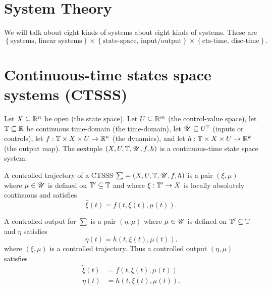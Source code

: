 \section{System Theory}

We will talk about eight kinds of systems about eight kinds of systems. These are 
\[
\left\{ \text{systems, linear systems} \right\} \times  \left\{ \text{state-space, input/output} \right\} \times  \left\{ \text{cts-time, disc-time} \right\} 
.\] 
\section{Continuous-time states space systems (CTSSS)}
\begin{definition}
	Let $X \subseteq \mathbb{R} ^{n}$ be open (the state space). Let $U \subseteq \mathbb{R} ^{m}$ (the control-value space), let $\mathbb{T} \subseteq \mathbb{R}$ be continuous time-domain (the time-domain), let $\mathscr{U} \subseteq U^{\mathbb{T}}$ (inputs or controls), let $f : \mathbb{T} \times  X \times  U \to \mathbb{R}^{n}$ (the dynamics), and let  $h  : \mathbb{T} \times  X \times  U  \to \mathbb{R} ^{k}$ (the output map). The sextuple $\left( X, U, \mathbb{T}, \mathscr{U}, f, h \right) $ is a continuous-time state space system. 
\end{definition}

\begin{definition}
	A controlled trajectory of a CTSSS $\sum = \left( X, U, \mathbb{T}, \mathscr{U}, f, h \right)  $ is a pair $\left( \xi , \mu \right) $ where $\mu \in  \mathscr{U}$ is defined on $\mathbb{T} ' \subseteq \mathbb{T}$ and where $\xi : \mathbb{T} '  \to X$ is locally absolutely continuous and satisfies 
	\[
		\hat{\xi}\left( t \right) = f\left( t, \xi\left( t \right) , \mu\left( t \right)  \right) 
	.\] 
\end{definition}

\begin{definition}
	A controlled output for $\sum$ is a pair $\left( \eta, \mu \right) $ where $\mu \in  \mathscr{U}$ is defined on $\mathbb{T} ' \subseteq \mathbb{T}$ and $\eta$ satisfies 
	\[
		\eta\left( t \right) = h \left( t, \xi\left( t \right) , \mu\left( t \right)  \right) 
	.\] 
	where $\left( \xi, \mu \right) $ is a controlled trajectory. Thus a controlled output $ \left( \eta, \mu \right) $ satisfies 
	\begin{align*}
		\dot{\xi} \left( t \right) &= f\left( t, \xi\left( t \right) , \mu\left( t \right)  \right)  \\
		\eta\left( t \right) &= h \left( t, \xi\left( t \right) , \mu\left( t \right)  \right) 
	.\end{align*}
\end{definition}


